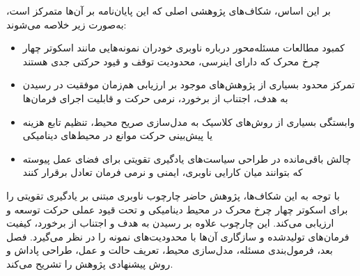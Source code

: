 بر این اساس، شکاف‌های پژوهشی اصلی که این پایان‌نامه بر آن‌ها متمرکز است، به‌صورت زیر خلاصه می‌شوند:
\begin{itemize}
	\item کمبود مطالعات مسئله‌محور درباره ناوبری خودران نمونه‌هایی مانند اسکوتر چهار چرخ محرک که دارای اینرسی، محدودیت توقف و قیود حرکتی جدی هستند
	\item تمرکز محدود بسیاری از پژوهش‌های موجود بر ارزیابی هم‌زمان موفقیت در رسیدن به هدف، اجتناب از برخورد، نرمی حرکت و قابلیت اجرای فرمان‌ها
	\item وابستگی بسیاری از روش‌های کلاسیک به مدل‌سازی صریح محیط، تنظیم تابع هزینه یا پیش‌بینی حرکت موانع در محیط‌های دینامیکی
	\item چالش باقی‌مانده در طراحی سیاست‌های یادگیری تقویتی برای فضای عمل پیوسته که بتوانند میان کارایی ناوبری، ایمنی و نرمی فرمان تعادل برقرار کنند
\end{itemize}

با توجه به این شکاف‌ها، پژوهش حاضر چارچوب ناوبری مبتنی بر یادگیری تقویتی را برای اسکوتر چهار چرخ محرک در محیط دینامیکی و تحت قیود عملی حرکت توسعه و ارزیابی می‌کند. این چارچوب علاوه بر رسیدن به هدف و اجتناب از برخورد، کیفیت فرمان‌های تولیدشده و سازگاری آن‌ها با محدودیت‌های نمونه را در نظر می‌گیرد. فصل بعد، فرمول‌بندی مسئله، مدل‌سازی محیط، تعریف حالت و عمل، طراحی پاداش و روش پیشنهادی پژوهش را تشریح می‌کند.
